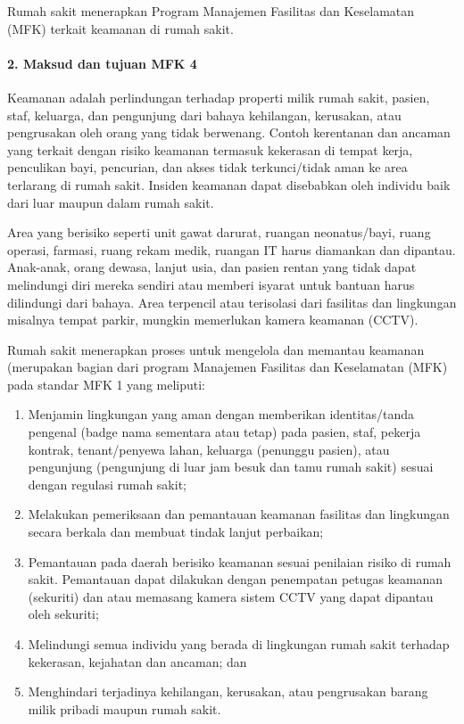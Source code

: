 \documentclass[
]{book}
\providecommand{\tightlist}{%
  \setlength{\itemsep}{0pt}\setlength{\parskip}{0pt}}
\begin{document}
Rumah sakit menerapkan Program Manajemen Fasilitas dan Keselamatan (MFK) terkait keamanan di rumah sakit.

\hypertarget{maksud-dan-tujuan-mfk-4}{%
\paragraph*{2. Maksud dan tujuan MFK 4}\label{maksud-dan-tujuan-mfk-4}}

Keamanan adalah perlindungan terhadap properti milik rumah sakit, pasien, staf, keluarga, dan pengunjung dari bahaya kehilangan, kerusakan, atau pengrusakan oleh orang yang tidak berwenang. Contoh kerentanan dan ancaman yang terkait dengan risiko keamanan termasuk kekerasan di tempat kerja, penculikan bayi, pencurian, dan akses tidak terkunci/tidak aman ke area terlarang di rumah sakit. Insiden keamanan dapat disebabkan oleh individu baik dari luar maupun dalam rumah sakit.

Area yang berisiko seperti unit gawat darurat, ruangan neonatus/bayi, ruang operasi, farmasi, ruang rekam medik, ruangan IT harus diamankan dan dipantau. Anak-anak, orang dewasa, lanjut usia, dan pasien rentan yang tidak dapat melindungi diri mereka sendiri atau memberi isyarat untuk bantuan harus dilindungi dari bahaya. Area terpencil atau terisolasi dari fasilitas dan lingkungan misalnya tempat parkir, mungkin memerlukan kamera keamanan (CCTV).

Rumah sakit menerapkan proses untuk mengelola dan memantau keamanan (merupakan bagian dari program Manajemen Fasilitas dan Keselamatan (MFK) pada standar MFK 1 yang meliputi:

\begin{enumerate}
\def\labelenumi{\alph{enumi}.}
\tightlist
\item
  Menjamin lingkungan yang aman dengan memberikan identitas/tanda pengenal (badge nama sementara atau tetap) pada pasien, staf, pekerja kontrak, tenant/penyewa lahan, keluarga (penunggu pasien), atau pengunjung (pengunjung di luar jam besuk dan tamu rumah sakit) sesuai dengan regulasi rumah sakit;
\item
  Melakukan pemeriksaan dan pemantauan keamanan fasilitas dan lingkungan secara berkala dan membuat tindak lanjut perbaikan;
\item
  Pemantauan pada daerah berisiko keamanan sesuai penilaian risiko di rumah sakit. Pemantauan dapat dilakukan dengan penempatan petugas keamanan (sekuriti) dan atau memasang kamera sistem CCTV yang dapat dipantau oleh sekuriti;
\item
  Melindungi semua individu yang berada di lingkungan rumah sakit terhadap kekerasan, kejahatan dan ancaman; dan
\item
  Menghindari terjadinya kehilangan, kerusakan, atau pengrusakan barang milik pribadi maupun rumah sakit.
\end{enumerate}
\end{document}
